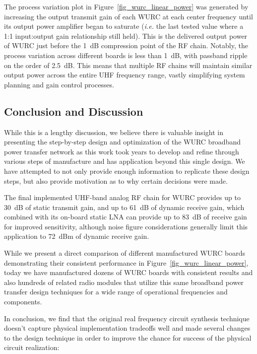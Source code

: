 	The process variation plot in Figure~\ref{fig_wurc_linear_power} was generated by increasing the output transmit gain of each \ac{WURC} at each center frequency until its output power amplifier began to saturate (\emph{i.e.} the last tested value where a 1:1 input:output gain relationship still held).
This is the delivered output power of \ac{WURC} just before the 1~dB compression point of the RF chain.
Notably, the process variation across different boards is less than 1~dB, with passband ripple on the order of 2.5~dB.
This means that multiple RF chains will maintain similar output power across the entire UHF frequency range, vastly simplifying system planning and gain control processes.

\subsection{Conclusion and Discussion}

	While this is a lengthy discussion, we believe there is valuable insight in presenting the step-by-step design and optimization of the \ac{WURC} broadband power transfer network as this work took years to develop and refine through various steps of manufacture and has application beyond this single design.
	We have attempted to not only provide enough information to replicate these design steps, but also provide motivation as to why certain decisions were made.

	The final implemented UHF-band analog RF chain for \ac{WURC} provides up to 30~dB of static transmit gain, and up to 61~dB of dynamic receive gain, which combined with its on-board static \ac{LNA} can provide up to 83~dB of receive gain for improved sensitivity, although noise figure considerations generally limit this application to 72~dBm of dynamic receive gain.

 While we present a direct comparison of different manufactured \ac{WURC} boards demonstrating their consistent performance in Figure~\ref{fig_wurc_linear_power}, today we have manufactured dozens of \ac{WURC} boards with consistent results and also hundreds of related radio modules that utilize this same broadband power transfer design techniques for a wide range of operational frequencies and components.
	
	In conclusion, we find that the original real frequency circuit synthesis technique doesn't capture physical implementation tradeoffs well and made several changes to the design technique in order to improve the chance for success of the physical circuit realization:


